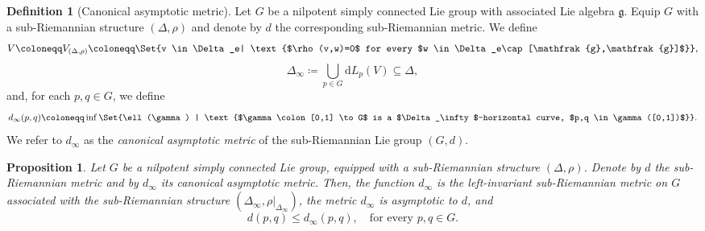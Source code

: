 \documentclass[a4paper,11pt,reqno]{amsart}
\theoremstyle{plain}
\newtheorem{proposition}[theorem]{Proposition}
\theoremstyle{definition}
\newtheorem{definition}[theorem]{Definition}
\newcommand{\g}{\mathfrak{g}}
\newcommand{\id}{e}
\newcommand{\de}{\mathrm{d}}
\newcommand{\coloneq}{\coloneqq}
\begin{document}
\begin{definition}[Canonical asymptotic metric]
Let $G$ be a nilpotent simply connected Lie group with associated Lie algebra $\g$. Equip $G$ with a sub-Riemannian structure $(\Delta,\rho)$ and denote by $d$ the corresponding sub-Riemannian metric.
 We define 
	\begin{equation} \label{def V}
		V \coloneq V_{(\Delta,\rho)} \coloneq \Set{v \in \Delta_\id | \text{$\rho(v,w)=0$ for every $w \in \Delta_\id \cap [\g,\g]$}},
	\end{equation}
	\begin{equation} \label{def delta infty}
		\Delta_\infty \coloneq \bigcup_{p \in G} \de L_p(V) \subseteq \Delta,
	\end{equation}
 and, for each $p,q\in G$, we define 
	\begin{equation} \label{asymptotic metric}
		d_\infty(p,q) \coloneq \inf \Set{\ell(\gamma) | \text{$\gamma \colon [0,1] \to G$ is a $\Delta_\infty$-horizontal curve, $p,q \in \gamma([0,1])$}} .
	\end{equation}
We refer to $d_\infty$ as the \emph{canonical asymptotic metric} of the sub-Riemannian Lie group $(G,d)$.
\end{definition}
 \begin{proposition} \label{prop_asymptotic}
 Let $G$ be a nilpotent simply connected Lie group, equipped with a sub-Riemannian structure $(\Delta,\rho)$. Denote by $d$ the sub-Riemannian metric and by $d_\infty$ its canonical asymptotic metric. Then, the function $d_\infty$ is the left-invariant sub-Riemannian metric on $G$ associated with the sub-Riemannian structure $(\Delta_\infty,\rho|_{\Delta_\infty})$, the metric
 $d_\infty$ is asymptotic to $d$, and
 \begin{equation} \label{obvious bound}
 d(p,q) \le d_\infty(p,q), \quad \text{for every $p,q \in G$.}
 \end{equation}
 \end{proposition}
\end{document}
